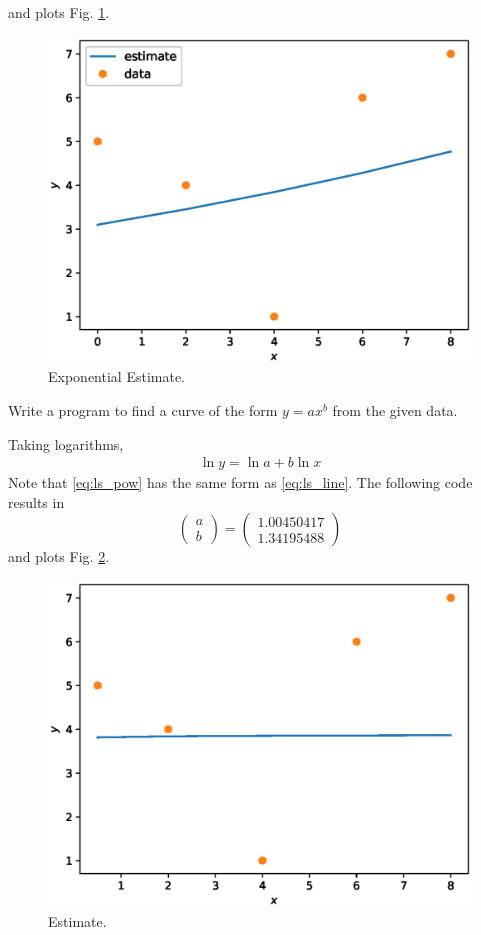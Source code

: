 \documentclass[journal,12pt,twocolumn]{IEEEtran}
\begin{document}
and plots Fig. \ref{fig:ls_exp}.

\begin{figure}[!h]
\centering
\includegraphics[width=\columnwidth]{./figs/ls_exp.eps}
\caption{Exponential Estimate.}
\label{fig:ls_exp}
\end{figure}
%
\begin{problem}
Write a program to find a curve of the form $y = ax^{ b}$ from the given
data.
\end{problem}
\solution Taking logarithms,
\begin{align}
\label{eq:ls_pow}
\ln y = \ln a + b\ln x
\end{align}
\solution
Note that \eqref{eq:ls_pow} has the same form as \eqref{eq:ls_line}. The following code results in
\begin{equation}
\begin{pmatrix}
a
\\
b
\end{pmatrix}
= 
\begin{pmatrix}
 1.00450417 \\ 1.34195488
\end{pmatrix} 
\end{equation}
and plots Fig. \ref{fig:ls_pow}.

\begin{figure}[!h]
\centering
\includegraphics[width=\columnwidth]{./figs/ls_pow.eps}
\caption{Estimate.}
\label{fig:ls_pow}
\end{figure}
%


\end{document}
